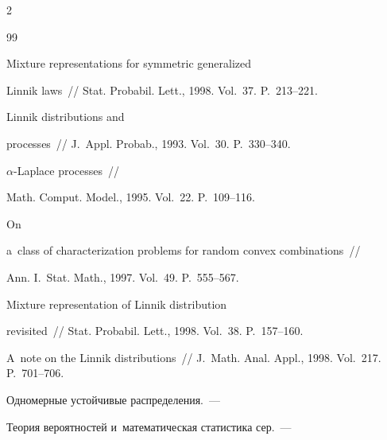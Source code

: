 \begin{multicols}{2}
{{\begin{thebibliography}{99}


 Mixture representations for symmetric generalized


Linnik laws~// Stat. Probabil. Lett., 1998. Vol.~37. P.~213--221.







 Linnik distributions and


processes~// J.~Appl. Probab., 1993. Vol.~30. P.~330--340.







 $\alpha$-Laplace processes~// 


Math. Comput. Model., 1995. Vol.~22. P.~109--116.







 On 


a~class of characterization problems for random convex combinations~// 


Ann. I.~Stat. Math., 1997. Vol.~49. P.~555--567.













 Mixture representation of Linnik distribution


revisited~// Stat. Probabil. Lett., 1998. Vol.~38. P.~157--160.







 A~note on the Linnik distributions~// J.~Math. Anal. Appl., 1998. Vol.~217. P.~701--706.







 Одномерные устойчивые распределения.~--- 


Теория вероятностей и~математическая статистика сер.~---



\end{thebibliography}}}
\end{multicols}
